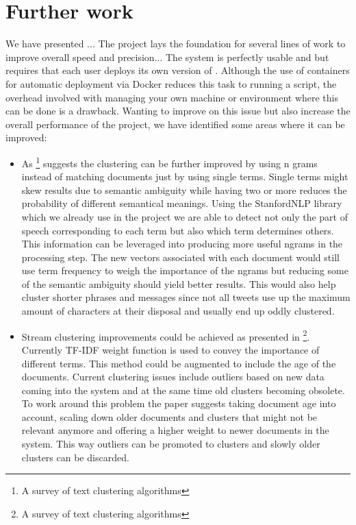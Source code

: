 \chapter{Further work}
\label{sec:furtherwork}

We have presented ... 
The project lays the foundation for several lines of work to improve overall speed and precision...
The system is perfectly usable and but requires that each user deploys its own version of {\project}. Although the use of containers for automatic deployment via Docker reduces this task to running a script, the overhead involved with managing your own machine or environment where this can be done is a drawback. Wanting to improve on this issue but also increase the overall performance of the project, we have identified some areas where it can be improved:
\begin{itemize}
	\item As \footnote{A survey of text clustering algorithms} suggests the clustering can be further improved by using n grams instead of matching documents just by using single terms. Single terms might skew results due to semantic ambiguity while having two or more reduces the probability of different semantical meanings. Using the StanfordNLP library which we already use in the project we are able to detect not only the part of speech corresponding to each term but also which term determines others. This information can be leveraged into producing more useful ngrams in the processing step. The new vectors associated with each document would still use term frequency to weigh the importance of the ngrams but reducing some of the semantic ambiguity should yield better results. This would also help cluster shorter phrases and messages since not all tweets use up the maximum amount of characters at their disposal and usually end up oddly clustered.
	\item Stream clustering improvements could be achieved as presented in \footnote{A survey of text clustering algorithms}. Currently TF-IDF weight function is used to convey the importance of different terms. This method could be augmented to include the age of the documents. Current clustering issues include outliers based on new data coming into the system and at the same time old clusters becoming obsolete. To work around this problem the paper suggests taking document age into account, scaling down older documents and clusters that might not be relevant anymore and offering a higher weight to newer documents in the system. This way outliers can be promoted to clusters and slowly older clusters can be discarded.

\end{itemize}
